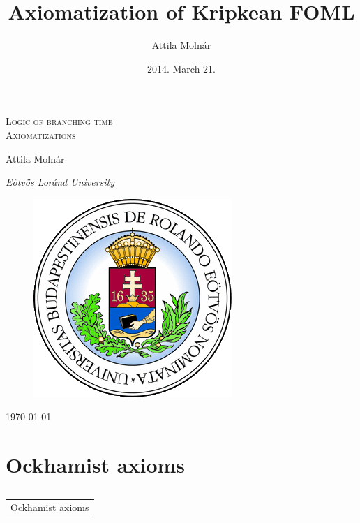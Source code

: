 \documentclass[xcolor=x11names]{beamer}
\author{Attila Moln\'ar}
\date{2014. March 21.}
\title{Axiomatization of Kripkean FOML}
\institute{ELTE}
\makeatletter
\let\beamer@writeslidentry@miniframeson=\beamer@writeslidentry
\def\beamer@writeslidentry@miniframesoff{%
  \expandafter\beamer@ifempty\expandafter{\beamer@framestartpage}{}%
  {%
    \clearpage\beamer@notesactions%
  }
}
\newcommand*{\miniframeson}{\let\beamer@writeslidentry=\beamer@writeslidentry@miniframeson}
\newcommand*{\miniframesoff}{\let\beamer@writeslidentry=\beamer@writeslidentry@miniframesoff}
\newcommand{\cimdia}[1] {\miniframesoff \begin{frame}\begin{center}\huge \begin{tabular}{c}#1\end{tabular}\end{center}\end{frame}\miniframeson}
\newcommand{\szakasz}[2][]{\section{#1}\subsection{}\cimdia{#2}}
\makeatother
\begin{document}
\footnotesize


\begin{frame}
\centering
\textsc{\Large Logic of branching time\\[1em] Axiomatizations}

\bigskip

{ \small Attila Moln\'ar

    \textit{E\"otv\"os Lor\'and University}}

 \begin{figure}
\includegraphics[scale=.3]{elte_cimer.png}
 \end{figure}

	\today
\end{frame}


\szakasz[Ockhamist axioms]{Ockhamist axioms}
\end{document}
